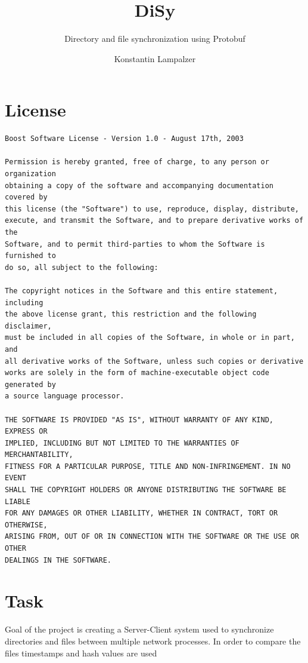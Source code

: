 \documentclass[a4paper]{article}
\title{DiSy}
\subtitle{Directory and file synchronization using Protobuf}
\author{Konstantin Lampalzer}
\date{}
\begin{document}
 
\begin{titlepage}
\maketitle
\end{titlepage}

\tableofcontents
\thispagestyle{empty}
\newpage

\section{License}
\begin{verbatim}
Boost Software License - Version 1.0 - August 17th, 2003

Permission is hereby granted, free of charge, to any person or organization
obtaining a copy of the software and accompanying documentation covered by
this license (the "Software") to use, reproduce, display, distribute,
execute, and transmit the Software, and to prepare derivative works of the
Software, and to permit third-parties to whom the Software is furnished to
do so, all subject to the following:

The copyright notices in the Software and this entire statement, including
the above license grant, this restriction and the following disclaimer,
must be included in all copies of the Software, in whole or in part, and
all derivative works of the Software, unless such copies or derivative
works are solely in the form of machine-executable object code generated by
a source language processor.

THE SOFTWARE IS PROVIDED "AS IS", WITHOUT WARRANTY OF ANY KIND, EXPRESS OR
IMPLIED, INCLUDING BUT NOT LIMITED TO THE WARRANTIES OF MERCHANTABILITY,
FITNESS FOR A PARTICULAR PURPOSE, TITLE AND NON-INFRINGEMENT. IN NO EVENT
SHALL THE COPYRIGHT HOLDERS OR ANYONE DISTRIBUTING THE SOFTWARE BE LIABLE
FOR ANY DAMAGES OR OTHER LIABILITY, WHETHER IN CONTRACT, TORT OR OTHERWISE,
ARISING FROM, OUT OF OR IN CONNECTION WITH THE SOFTWARE OR THE USE OR OTHER
DEALINGS IN THE SOFTWARE.
\end{verbatim}

\newpage

\section{Task}
Goal of the project is creating a Server-Client system used to synchronize directories and files between multiple network processes. In order to compare the files timestamps and hash values are used
\end{document}
